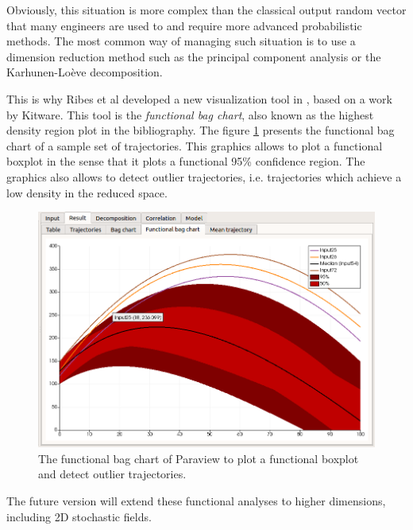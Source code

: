 \documentclass{article}
\begin{document}
Obviously, this situation is more complex than the classical output random 
vector that many engineers are used to and require more advanced 
probabilistic methods. 
The most common way of managing such situation is to use a 
dimension reduction method such as the principal component analysis or the 
Karhunen-Loève decomposition. 

This is why Ribes et al \cite{Ribes2014} developed a new visualization tool in \cite{PVurl}, based on a 
work by Kitware. 
This tool is the \emph{functional bag chart}, also known as the highest density region 
plot in the bibliography. 
The figure \ref{fig-functionnalbagchart} presents the functional bag chart of a sample 
set of trajectories. 
This graphics allows to plot a functional boxplot in the sense that it plots a functional 95\% confidence 
region. 
The graphics also allows to detect outlier trajectories, i.e. trajectories which achieve a low 
density in the reduced space. 

\begin{figure}
\centering
\includegraphics[width=\textwidth]{figures/functional_bag_chart-focus.png}
\caption{The functional bag chart of Paraview to plot a functional boxplot and detect outlier trajectories.}
\label{fig-functionnalbagchart}
\end{figure}

The future version will extend these functional analyses to higher dimensions, including 2D stochastic fields. 






\end{document}
